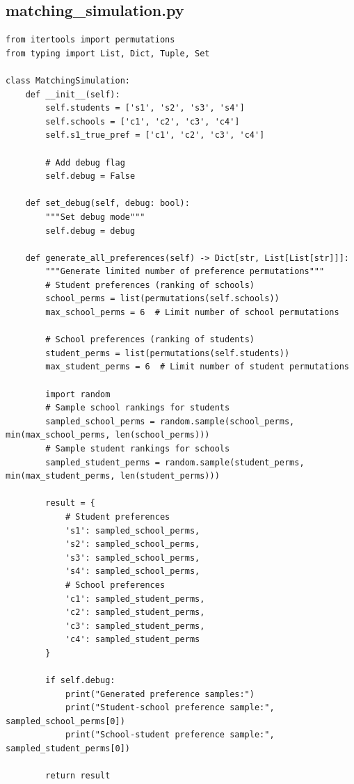 \documentclass{article}
\begin{document}
\subsection{matching\_simulation.py}
\begin{verbatim}
from itertools import permutations
from typing import List, Dict, Tuple, Set

class MatchingSimulation:
    def __init__(self):
        self.students = ['s1', 's2', 's3', 's4']
        self.schools = ['c1', 'c2', 'c3', 'c4']
        self.s1_true_pref = ['c1', 'c2', 'c3', 'c4']
        
        # Add debug flag
        self.debug = False
        
    def set_debug(self, debug: bool):
        """Set debug mode"""
        self.debug = debug
        
    def generate_all_preferences(self) -> Dict[str, List[List[str]]]:
        """Generate limited number of preference permutations"""
        # Student preferences (ranking of schools)
        school_perms = list(permutations(self.schools))
        max_school_perms = 6  # Limit number of school permutations
        
        # School preferences (ranking of students) 
        student_perms = list(permutations(self.students))
        max_student_perms = 6  # Limit number of student permutations
        
        import random
        # Sample school rankings for students
        sampled_school_perms = random.sample(school_perms, min(max_school_perms, len(school_perms)))
        # Sample student rankings for schools
        sampled_student_perms = random.sample(student_perms, min(max_student_perms, len(student_perms)))
            
        result = {
            # Student preferences
            's1': sampled_school_perms,
            's2': sampled_school_perms,
            's3': sampled_school_perms,
            's4': sampled_school_perms,
            # School preferences
            'c1': sampled_student_perms,
            'c2': sampled_student_perms,
            'c3': sampled_student_perms,
            'c4': sampled_student_perms
        }
        
        if self.debug:
            print("Generated preference samples:")
            print("Student-school preference sample:", sampled_school_perms[0])
            print("School-student preference sample:", sampled_student_perms[0])
        
        return result
        

\end{verbatim}
\end{document}

